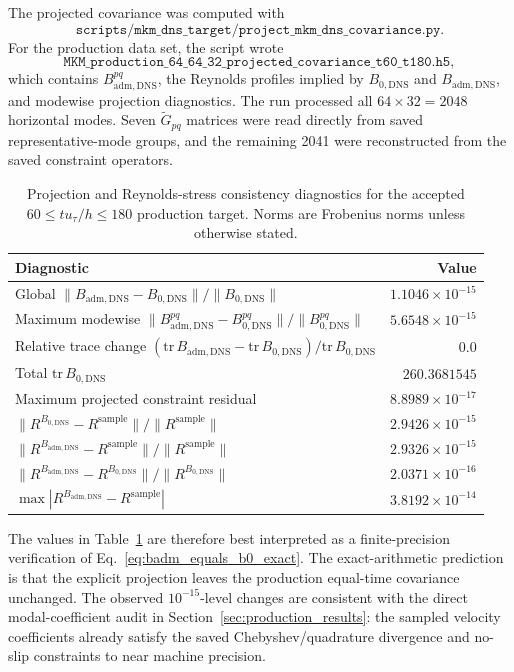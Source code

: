 \documentclass[11pt]{article}
\newcommand{\Gtilde}{\widetilde{G}}
\newcommand{\Bzero}{B_{0,\mathrm{DNS}}}
\newcommand{\Badm}{B_{\mathrm{adm},\mathrm{DNS}}}
\begin{document}
The projected covariance was computed with
\[
  \texttt{scripts/mkm\_dns\_target/project\_mkm\_dns\_covariance.py}.
\]
For the production data set, the script wrote
\[
  \texttt{MKM\_production\_64\_64\_32\_projected\_covariance\_t60\_t180.h5},
\]
which contains \(\Badm^{pq}\), the Reynolds profiles implied by
\(\Bzero\) and \(\Badm\), and modewise projection diagnostics. The run
processed all \(64\times32=2048\) horizontal modes. Seven \(\Gtilde_{pq}\)
matrices were read directly from saved representative-mode groups, and the
remaining 2041 were reconstructed from the saved constraint operators.

\begin{table}[H]
  \centering
  \caption{Projection and Reynolds-stress consistency diagnostics for the
  accepted \(60\le t u_{\tau}/h\le180\) production target. Norms are Frobenius
  norms unless otherwise stated.}
  \label{tab:projected_covariance_diagnostics}
  \begin{tabular}{lr}
    \toprule
    Diagnostic & Value \\
    \midrule
    Global \(\|\Badm-\Bzero\|/\|\Bzero\|\) & \(1.1046\times10^{-15}\) \\
    Maximum modewise \(\|\Badm^{pq}-\Bzero^{pq}\|/\|\Bzero^{pq}\|\) & \(5.6548\times10^{-15}\) \\
    Relative trace change \((\mathrm{tr}\,\Badm-\mathrm{tr}\,\Bzero)/\mathrm{tr}\,\Bzero\) & \(0.0\) \\
    Total \(\mathrm{tr}\,\Bzero\) & \(260.3681545\) \\
    Maximum projected constraint residual & \(8.8989\times10^{-17}\) \\
    \(\|R^{\Bzero}-R^{\mathrm{sample}}\|/\|R^{\mathrm{sample}}\|\) & \(2.9426\times10^{-15}\) \\
    \(\|R^{\Badm}-R^{\mathrm{sample}}\|/\|R^{\mathrm{sample}}\|\) & \(2.9326\times10^{-15}\) \\
    \(\|R^{\Badm}-R^{\Bzero}\|/\|R^{\Bzero}\|\) & \(2.0371\times10^{-16}\) \\
    \(\max |R^{\Badm}-R^{\mathrm{sample}}|\) & \(3.8192\times10^{-14}\) \\
    \bottomrule
  \end{tabular}
\end{table}

The values in Table~\ref{tab:projected_covariance_diagnostics} are therefore
best interpreted as a finite-precision verification of
Eq.~\eqref{eq:badm_equals_b0_exact}. The exact-arithmetic prediction is that
the explicit projection leaves the production equal-time covariance unchanged.
The observed \(10^{-15}\)-level changes are consistent with the direct
modal-coefficient audit in Section~\ref{sec:production_results}: the sampled
velocity coefficients already satisfy the saved Chebyshev/quadrature
divergence and no-slip constraints to near machine precision.
\end{document}
